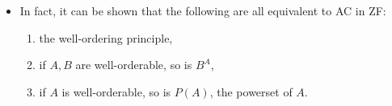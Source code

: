 \documentclass[12pt]{article}
\begin{document}
\begin{itemize}
\begin{proof}
\begin{itemize}
\end{itemize}
In either case, $\min[f,h]\le_A \min(b,c)$.  Now, suppose $a<\min[f,h]$.  Then $f(a)=g(a)=h(a)$.  As a result, $f <_C h$.  \end{proof}
\item
In fact, it can be shown that the following are all equivalent to AC in ZF:
\begin{enumerate}
\item the well-ordering principle,
\item if $A,B$ are well-orderable, so is $B^A$,
\item if $A$ is well-orderable, so is $P(A)$, the powerset of $A$.
\end{enumerate}
\end{itemize}


\end{document}

